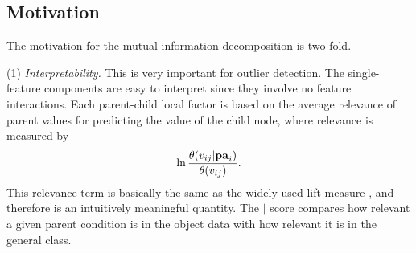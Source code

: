 {%



\subsection{Motivation} 
%
The motivation for the mutual information decomposition is two-fold. 

\noindent
(1) {\em Interpretability.} This is very important for outlier detection. The single-feature components are easy to interpret since they involve no feature interactions. Each parent-child local factor is based on the average relevance of parent values for predicting the value of the child node, where relevance is measured by $$\ln \frac{\theta(v_{ij}|\mathbf{pa}_{i})}{\theta(v_{ij})}.$$ This relevance term  is basically the same as the widely used lift measure \cite{Tuffery2011}, and therefore is an intuitively meaningful quantity. The $\mid$ score compares how relevant a given parent condition is in the object data with how relevant it is in the general class. 

}
